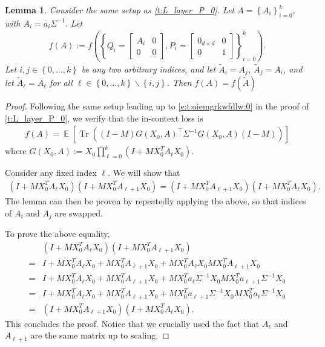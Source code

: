 \documentclass{article}
\DeclareMathOperator{\E}{\mathbb{E}}
\newtheorem{lemma}{Lemma}
\DeclareMathOperator{\tr}{Tr}
\newcommand*\lrb[1]{\left[ #1 \right]}
\newcommand*\lrp[1]{\left( #1 \right)}
\newcommand*\lrbb[1]{\left\{ #1 \right\}}
\begin{document}
\begin{lemma}
\label{l:bar}
Consider the same setup as \autoref{t:L_layer_P_0}. Let $A = \lrbb{A_i}_{i=0}^k$, with $A_i = a_i \Sigma^{-1}$. Let 
\begin{align}
    f(A) := f \lrp{ \left\{ Q_i = \begin{bmatrix}
A_i & 0 \\ 
0 & 0
\end{bmatrix}, P_i = \begin{bmatrix}
0_{d\times d} & 0 \\ 
0 & 1 
\end{bmatrix}\right\}_{i=0}^k}.
\end{align}
Let $i,j \in \lrbb{0, \dots, k}$ be any two arbitrary indices, and let $\tilde{A}_i = A_j$, $\tilde{A}_j = A_i$, and let $\tilde{A}_{\ell} = A_\ell$ for all $\ell \in \lrbb{0,\dots ,k} \backslash \lrbb{i,j}$. Then $f(A) = f(\tilde{A})$
\end{lemma}
\begin{proof}
Following the same setup leading up to \eqref{e:t:oiemgrkwfdlw:0} in the proof of \autoref{t:L_layer_P_0}, we verify that the in-context loss is 
\begin{align*}
f(A) = \E \lrb{\tr\lrp{\lrp{I-M} G(X_0,A)^\top \Sigma^{-1} G(X_0,A)\lrp{I-M}}}
\end{align*}
where $G(X_0,A) := X_0 \prod_{\ell=0}^{k} \lrp{I + M X_0^T A_\ell X_0}$.

Consider any fixed index $\ell$. We will show that
\begin{align*}
\lrp{I + M X_0^T A_{\ell} X_0} \lrp{I + M X_0^T A_{\ell+1} X_0}
= \lrp{I + M X_0^T A_{\ell+1} X_0} \lrp{I + M X_0^T A_{\ell} X_0}.
\end{align*}
The lemma can then be proven by repeatedly applying the above, so that indices of $A_i$ and $A_j$ are swapped.

To prove the above equality, 
\begin{align*}
& \lrp{I + M X_0^T A_{\ell} X_0} \lrp{I + M X_0^T A_{\ell+1} X_0}\\
=& I + M X_0^T A_{\ell} X_0 + M X_0^T A_{\ell+1} X_0 + M X_0^T A_{\ell} X_0M X_0^T A_{\ell+1} X_0\\
=& I + M X_0^T A_{\ell} X_0 + M X_0^T A_{\ell+1} X_0 + M X_0^T a_{\ell} \Sigma^{-1} X_0M X_0^T a_{\ell+1} \Sigma^{-1} X_0\\
=& I + M X_0^T A_{\ell} X_0 + M X_0^T A_{\ell+1} X_0 + M X_0^T a_{\ell+1} \Sigma^{-1} X_0M X_0^T a_{\ell} \Sigma^{-1} X_0\\
=& \lrp{I + M X_0^T A_{\ell+1} X_0} \lrp{I + M X_0^T A_{\ell} X_0}.
\end{align*}
This concludes the proof. Notice that we crucially used the fact that $A_\ell$ and $A_{\ell+1}$ are the same matrix up to scaling.
\end{proof}
\end{document}
